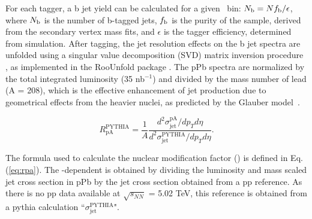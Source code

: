 For each tagger, a b jet yield can be calculated for a given \pt\ bin:  $N_{\rm b} = N f_{\rm b} / \epsilon$, where $N_{\rm b}$ is the number of b-tagged jets, $f_{\rm b}$ is the purity of the sample, derived from the secondary vertex mass fits, and $\epsilon$ is the tagger efficiency, determined from simulation.  After tagging, the jet resolution effects on the b jet \pt spectra are unfolded using a singular value decomposition (SVD) matrix inversion procedure \cite{svdunfold}, as implemented in the {\sc RooUnfold} package \cite{roounfold}. The pPb spectra are normalized by the total integrated luminosity (35 nb$^{-1}$) and divided by the mass number of lead (A = 208), which is the effective enhancement of jet production due to geometrical effects from the heavier nuclei, as predicted by the Glauber model~\cite{glauber}. 

\begin{equation}
\label{eq:rpa}
R_{\mathrm{pA}}^{\mathrm{PYTHIA}} = \frac{1}{A}\frac{d^{2}\sigma^{\mathrm{pA}}_{\mathrm{jet}}/dp_{T}d\eta}{d^2\sigma^{\mathrm{PYTHIA}}_{\mathrm{jet}}/dp_{T}d\eta}.
\end{equation}

The formula used to calculate the nuclear modification factor (\RpAPythia) is defined in Eq. (\ref{eq:rpa}). The \etaCM-dependent \RpAPythia is obtained by dividing the luminosity and mass scaled jet cross section in pPb by the jet cross section obtained from a pp reference. As there is no pp data available at $\sqrt{s_{NN}}$ = 5.02 TeV, this reference is obtained from a {\sc pythia} calculation ``$\sigma^{\mathrm{PYTHIA}}_{\mathrm{jet}}$".



